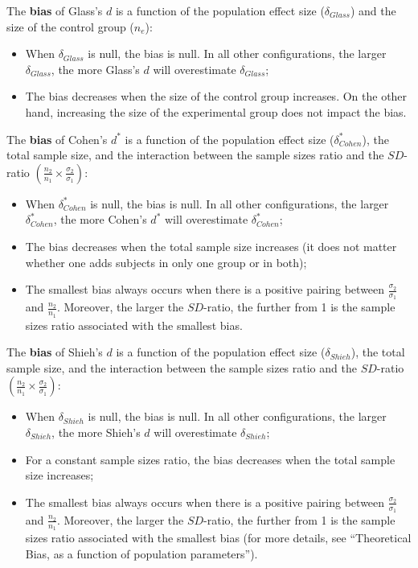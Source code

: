 \documentclass[
  english,
  man,mask]{apa6}
\providecommand{\tightlist}{%
  \setlength{\itemsep}{0pt}\setlength{\parskip}{0pt}}
\begin{document}
The \textbf{bias} of Glass's \(d\) is a function of the population effect size (\(\delta_{Glass}\)) and the size of the control group (\(n_e\)):

\begin{itemize}
\tightlist
\item
  When \(\delta_{Glass}\) is null, the bias is null. In all other configurations, the larger \(\delta_{Glass}\), the more Glass's \(d\) will overestimate \(\delta_{Glass}\);\\
\item
  The bias decreases when the size of the control group increases. On the other hand, increasing the size of the experimental group does not impact the bias.
\end{itemize}

The \textbf{bias} of Cohen's \(d^*\) is a function of the population effect size (\(\delta^*_{Cohen}\)), the total sample size, and the interaction between the sample sizes ratio and the \(SD\)-ratio \(\left(\frac{n_2}{n_1}\times\frac{\sigma_2}{\sigma_1} \right)\):

\begin{itemize}
\tightlist
\item
  When \(\delta^*_{Cohen}\) is null, the bias is null. In all other configurations, the larger \(\delta^*_{Cohen}\), the more Cohen's \(d^*\) will overestimate \(\delta^*_{Cohen}\);\\
\item
  The bias decreases when the total sample size increases (it does not matter whether one adds subjects in only one group or in both);
\item
  The smallest bias always occurs when there is a positive pairing between \(\frac{\sigma_2}{\sigma_1}\) and \(\frac{n_2}{n_1}\). Moreover, the larger the \(SD\)-ratio, the further from 1 is the sample sizes ratio associated with the smallest bias.
\end{itemize}

The \textbf{bias} of Shieh's \(d\) is a function of the population effect size (\(\delta_{Shieh}\)), the total sample size, and the interaction between the sample sizes ratio and the \(SD\)-ratio \(\left(\frac{n_2}{n_1}\times\frac{\sigma_2}{\sigma_1} \right)\):

\begin{itemize}
\tightlist
\item
  When \(\delta_{Shieh}\) is null, the bias is null. In all other configurations, the larger \(\delta_{Shieh}\), the more Shieh's \(d\) will overestimate \(\delta_{Shieh}\);\\
\item
  For a constant sample sizes ratio, the bias decreases when the total sample size increases;\\
\item
  The smallest bias always occurs when there is a positive pairing between \(\frac{\sigma_2}{\sigma_1}\) and \(\frac{n_2}{n_1}\). Moreover, the larger the \(SD\)-ratio, the further from 1 is the sample sizes ratio associated with the smallest bias (for more details, see ``Theoretical Bias, as a function of population parameters'').
\end{itemize}
\end{document}
